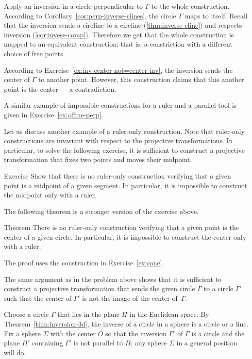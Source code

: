 Apply an inversion in a circle perpendicular to $\Gamma$ to the whole construction.
According to Corollary~\ref{cor:perp-inverse-clines},
the circle
$\Gamma$ maps to itself.
Recall that the inversion sends a circline to a circline (\ref{thm:inverse-cline}) and respects inversion (\ref{cor:invese-comp}).
Therefore we get that the whole  construction is mapped to an equivalent construction; 
that is, a constriction with a different choice of free points.

According to Exercise~\ref{ex:inv-center not=center-inv}, 
the inversion sends the center of $\Gamma$ to another point.
However, this construction claims that this another point is the center --- a contradiction.
\qeds

A similar example of impossible constructions for a ruler and a parallel tool
 is given in Exercise~\ref{ex:affine-perp}.
 
Let us discuss another example of a ruler-only construction.
Note that ruler-only constructions are invariant with respect to the projective transformations. 
In particular, to solve the following exercise, it is sufficient to construct a projective transformation that fixes two points and moves their midpoint.

\begin{thm}{Exercise}\label{ex:midpoint-proj}
Show that there is no ruler-only construction verifying that a given point is a  midpoint of a given segment.
In particular, it is impossible to construct the midpoint only with a ruler.
\end{thm}

The following theorem is a stronger version of the exercise above.

\begin{thm}{Theorem}\label{thm:circle-center-proj}
There is no ruler-only construction verifying that a given point is the center of a given circle.
In particular, it is impossible to construct the center only with a ruler.
\end{thm}

The proof uses the construction in Exercise~\ref{ex:cone}.

The same argument as in the problem above shows that 
it is sufficient to construct a projective transformation 
that sends the given circle $\Gamma$ to a circle $\Gamma'$ such that the center of $\Gamma'$ is not the image of the center of~$\Gamma$.

Choose a circle $\Gamma$ that lies in the plane $\Pi$ in the Euclidean space.
By Theorem~\ref{thm:inversion-3d}, 
the inverse of a circle in a sphere is a circle or a line.
Fix a sphere $\Sigma$ with the center $O$ so that the inversion $\Gamma'$ of $\Gamma$
is a circle and the plane $\Pi'$ containing $\Gamma'$ is not parallel to $\Pi$;
any sphere $\Sigma$ in a general position will do.

